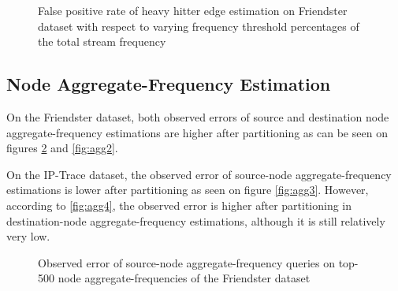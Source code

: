 \begin{figure}[!htbp]
\centering
{}
\caption{False positive rate of heavy hitter edge estimation on Friendster dataset with respect to varying frequency threshold percentages of the total stream frequency} \label{fig:EE2}
\end{figure}

\clearpage
\subsection{Node Aggregate-Frequency Estimation}

On the Friendster dataset, both observed errors of source and destination node aggregate-frequency estimations are higher after partitioning as can be seen on figures \ref{fig:agg1} and \ref{fig:agg2}.

On the IP-Trace dataset, the observed error of source-node aggregate-frequency estimations is lower after partitioning as seen on figure \ref{fig:agg3}. However, according to \ref{fig:agg4}, the observed error is higher after partitioning in destination-node aggregate-frequency estimations, although it is still relatively very low.

\begin{figure}[!htbp]
\centering
{}
\caption{Observed error of source-node aggregate-frequency queries on top-500 node aggregate-frequencies of the Friendster dataset} \label{fig:agg1}
\end{figure}

